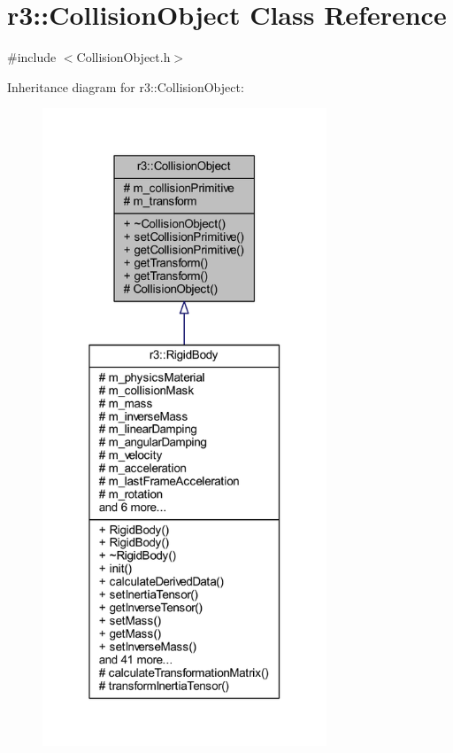 \hypertarget{classr3_1_1_collision_object}{}\section{r3\+:\+:Collision\+Object Class Reference}
\label{classr3_1_1_collision_object}


{\ttfamily \#include $<$Collision\+Object.\+h$>$}



Inheritance diagram for r3\+:\+:Collision\+Object\+:\nopagebreak
\begin{figure}[H]
\begin{center}
\leavevmode
\includegraphics[width=241pt]{classr3_1_1_collision_object__inherit__graph}
\end{center}
\end{figure}


